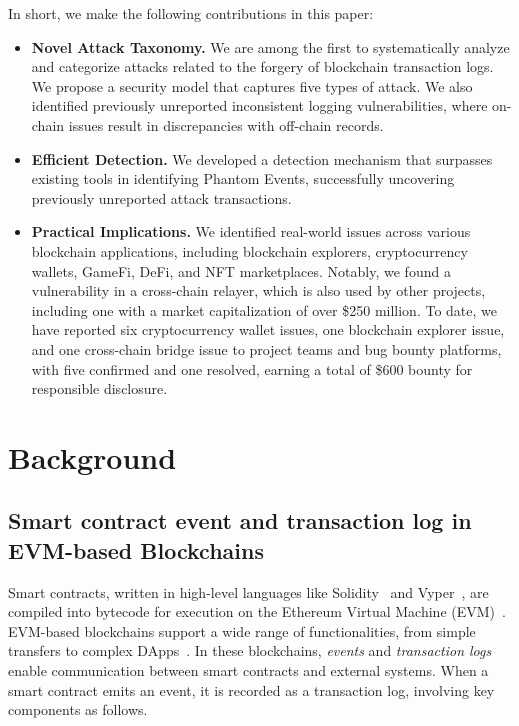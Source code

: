 In short, we make the following contributions in this paper:
\begin{itemize}
\item \textbf{Novel Attack Taxonomy.}
We are among the first to systematically analyze and categorize attacks
related to the forgery of blockchain transaction logs. We propose a security model that captures
five types of attack. We also identified previously unreported inconsistent logging
vulnerabilities, where on-chain issues result in discrepancies with off-chain records.
\item \textbf{Efficient Detection.}
We developed a detection mechanism that surpasses existing tools in identifying Phantom Events,
successfully uncovering previously unreported attack transactions.
\item \textbf{Practical Implications.}
We identified real-world issues across various blockchain applications, including blockchain
explorers, cryptocurrency wallets, GameFi, DeFi, and NFT marketplaces.
Notably, we found a vulnerability in a cross-chain relayer, which is also used by other projects,
including one with a market capitalization of over \$250 million.
To date, we have reported six cryptocurrency wallet issues, one blockchain explorer issue, and one
cross-chain bridge issue to project teams and bug bounty platforms, with five confirmed and one
resolved, earning a total of \$600 bounty for responsible disclosure.
\end{itemize}



\section{Background}\label{sec:Background}

\subsection{Smart contract event and transaction log in EVM-based Blockchains}
Smart contracts, written in high-level languages like Solidity~\cite{Solidity} and Vyper~\cite{Vyper}, are compiled into bytecode for execution on the Ethereum Virtual Machine (EVM)~\cite{EVM}. EVM-based blockchains support a wide range of functionalities, from simple transfers to complex DApps~\cite{DApp}. In these blockchains, \textit{events} and \textit{transaction logs} enable communication between smart contracts and external systems. When a smart contract emits an event, it is recorded as a transaction log, involving key components as follows.

